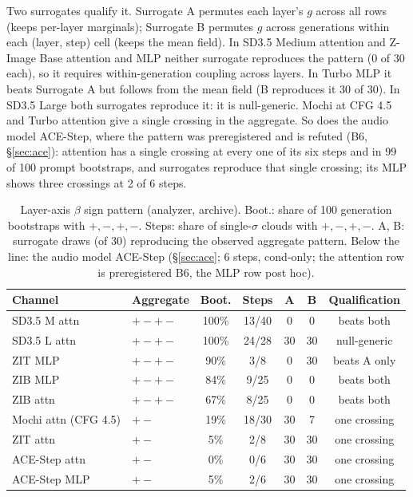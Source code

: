 \documentclass[11pt]{article}
\begin{document}
Two surrogates qualify it. Surrogate A permutes each layer's $g$ across all rows (keeps per-layer marginals); Surrogate B permutes $g$ across generations within each (layer, step) cell (keeps the mean field). In SD3.5 Medium attention and Z-Image Base attention and MLP neither surrogate reproduces the pattern (0 of 30 each), so it requires within-generation coupling across layers. In Turbo MLP it beats Surrogate A but follows from the mean field (B reproduces it 30 of 30). In SD3.5 Large both surrogates reproduce it: it is null-generic. Mochi at CFG 4.5 and Turbo attention give a single crossing in the aggregate. So does the audio model ACE-Step, where the pattern was preregistered and is refuted (B6, \S\ref{sec:ace}): attention has a single crossing at every one of its six steps and in 99 of 100 prompt bootstraps, and surrogates reproduce that single crossing; its MLP shows three crossings at 2 of 6 steps.

\begin{table}[h]
\centering\small
\caption{Layer-axis $\beta$ sign pattern (analyzer, archive). Boot.: share of 100 generation bootstraps with $+,-,+,-$. Steps: share of single-$\sigma$ clouds with $+,-,+,-$. A, B: surrogate draws (of 30) reproducing the observed aggregate pattern. Below the line: the audio model ACE-Step (\S\ref{sec:ace}; 6 steps, cond-only; the attention row is preregistered B6, the MLP row post hoc).}
\label{tab:beta}
\begin{tabular}{llccccc}
\toprule
Channel & Aggregate & Boot. & Steps & A & B & Qualification\\
\midrule
SD3.5 M attn & $+-+-$ & 100\% & 13/40 & 0 & 0 & beats both\\
SD3.5 L attn & $+-+-$ & 100\% & 24/28 & 30 & 30 & null-generic\\
ZIT MLP & $+-+-$ & 90\% & 3/8 & 0 & 30 & beats A only\\
ZIB MLP & $+-+-$ & 84\% & 9/25 & 0 & 0 & beats both\\
ZIB attn & $+-+-$ & 67\% & 8/25 & 0 & 0 & beats both\\
Mochi attn (CFG 4.5) & $+-$ & 19\% & 18/30 & 30 & 7 & one crossing\\
ZIT attn & $+-$ & 5\% & 2/8 & 30 & 30 & one crossing\\
\midrule
ACE-Step attn & $+-$ & 0\% & 0/6 & 30 & 30 & one crossing\\
ACE-Step MLP & $+-$ & 5\% & 2/6 & 30 & 30 & one crossing\\
\bottomrule
\end{tabular}
\end{table}
\end{document}
